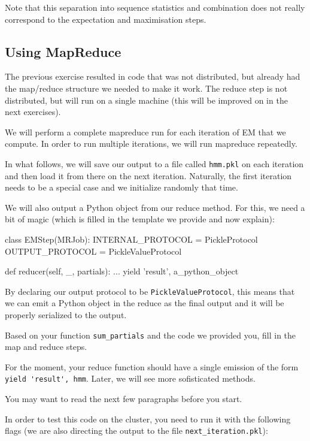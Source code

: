 Note that this separation into sequence statistics and combination does not
really correspond to the expectation and maximisation steps.

\subsection{Using MapReduce}
The previous exercise resulted in code that was not distributed, but already
had the map/reduce structure we needed to make it work. The reduce step is not
distributed, but will run on a single machine (this will be improved on in the
next exercises).

We will perform a complete mapreduce run for each iteration of EM that we
compute. In order to run multiple iterations, we will run mapreduce repeatedly.

In what follows, we will save our output to a file called \verb+hmm.pkl+ on
each iteration and then load it from there on the next iteration. Naturally,
the first iteration needs to be a special case and we initialize randomly that
time.

We will also output a Python object from our reduce method. For this, we need a
bit of magic (which is filled in the template we provide and now explain):

\begin{python}
class EMStep(MRJob):
    INTERNAL_PROTOCOL   = PickleProtocol
    OUTPUT_PROTOCOL     = PickleValueProtocol

    def reducer(self, _, partials):
        ...
        yield 'result', a_python_object
\end{python}

By declaring our output protocol to be \verb+PickleValueProtocol+, this means
that we can emit a Python object in the reduce as the final output and it will
be properly serialized to the output.

\begin{exercise}
Based on your function \verb+sum_partials+ and the code we provided you, fill in
the map and reduce steps.

For the moment, your reduce function should have a single emission of the form
\verb+yield 'result', hmm+. Later, we will see more sofisticated methods.

You may want to read the next few paragraphs before you start.
\end{exercise}

In order to test this code on the cluster, you need to run it with the
following flags (we are also directing the output to the file
\verb+next_iteration.pkl+):

